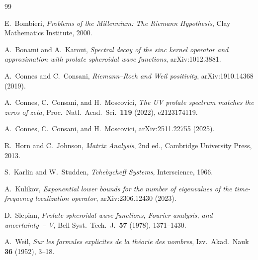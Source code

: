 \documentclass[12pt,a4paper]{amsart}
\theoremstyle{definition}
\begin{document}
\begin{thebibliography}{99}

E.~Bombieri,
\textit{Problems of the Millennium: The Riemann Hypothesis},
Clay Mathematics Institute, 2000.

A.~Bonami and A.~Karoui,
\textit{Spectral decay of the sinc kernel operator and approximation
with prolate spheroidal wave functions},
arXiv:1012.3881.

A.~Connes and C.~Consani,
\textit{Riemann--Roch and Weil positivity},
arXiv:1910.14368 (2019).

A.~Connes, C.~Consani, and H.~Moscovici,
\textit{The UV prolate spectrum matches the zeros of zeta},
Proc.\ Natl.\ Acad.\ Sci.\ \textbf{119} (2022), e2123174119.

A.~Connes, C.~Consani, and H.~Moscovici,
arXiv:2511.22755 (2025).

R.~Horn and C.~Johnson,
\textit{Matrix Analysis}, 2nd ed.,
Cambridge University Press, 2013.

S.~Karlin and W.~Studden,
\textit{Tchebycheff Systems},
Interscience, 1966.

A.~Kulikov,
\textit{Exponential lower bounds for the number of eigenvalues of
the time-frequency localization operator},
arXiv:2306.12430 (2023).

D.~Slepian,
\textit{Prolate spheroidal wave functions, Fourier analysis,
and uncertainty~-- V},
Bell Syst.\ Tech.\ J.\ \textbf{57} (1978), 1371--1430.

A.~Weil,
\textit{Sur les formules explicites de la th\'{e}orie des nombres},
Izv.\ Akad.\ Nauk \textbf{36} (1952), 3--18.

\end{thebibliography}
\end{document}
